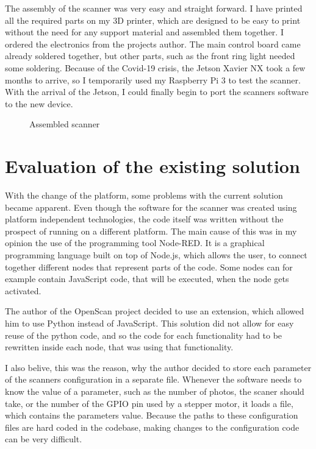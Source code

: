 The assembly of the scanner was very easy and straight forward.
I have printed all the required parts on my 3D printer, which are designed to be easy to print without the need for any support material and assembled them together.
I ordered the electronics from the projects author. The main control board came already soldered together, but other parts, such as the front ring light needed some soldering.
Because of the Covid-19 crisis, the Jetson Xavier NX took a few months to arrive, so I temporarily used my Raspberry Pi 3 to test the scanner.
With the arrival of the Jetson, I could finally begin to port the scanners software to the new device.

\begin{figure}[h!]
	\centering
    \qquad
	\caption{Assembled scanner}
\end{figure}
\newpage



\section{Evaluation of the existing solution}
With the change of the platform, some problems with the current solution became apparent.
Even though the software for the scanner was created using platform independent technologies, the code itself was written without the prospect of running on a different platform.
The main cause of this was in my opinion the use of the programming tool Node-RED.
It is a graphical programming language built on top of Node.js, which allows the user, to connect together different nodes that represent parts of the code. \cite{node-red}
Some nodes can for example contain JavaScript code, that will be executed, when the node gets activated.

The author of the OpenScan project decided to use an extension, which allowed him to use Python instead of JavaScript.
This solution did not allow for easy reuse of the python code, and so the code for each functionality had to be rewritten inside each node, that was using that functionality.

I also belive, this was the reason, why the author decided to store each parameter of the scanners configuration in a separate file.
Whenever the software needs to know the value of a parameter, such as the number of photos, the scaner should take, or the number of the GPIO pin used by a stepper motor, it loads a file, which contains the parameters value.
Because the paths to these configuration files are hard coded in the codebase, making changes to the configuration code can be very difficult.

